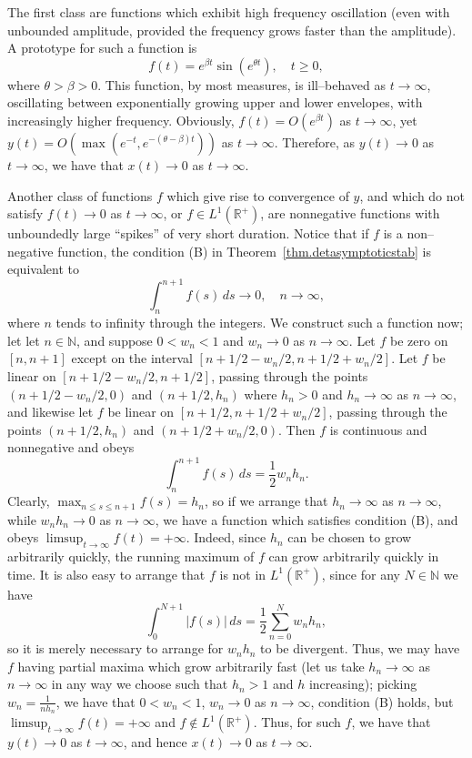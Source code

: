 \documentclass[a4paper,10pt,reqno]{amsart}
\numberwithin{equation}{section}
\theoremstyle{definition}
\theoremstyle{remark}
\DeclareMathOperator{\1}{\mathbbm 1}
\begin{document}
	The first class are functions which exhibit high frequency oscillation (even with unbounded amplitude, provided the frequency grows faster than the amplitude). A prototype for such a function is 
	\[
	f(t)= e^{\beta t}\sin(e^{\theta t}), \quad t\geq 0,
	\]  
	where $\theta>\beta>0$. This function, by most measures, is ill--behaved as $t\to\infty$, oscillating between exponentially growing upper and lower envelopes, with increasingly higher frequency. Obviously, $f(t)=O(e^{\beta t})$ as $t\to\infty$, yet $y(t)=O(\max(e^{-t},e^{-(\theta-\beta)t}))$ as $t\to\infty$. Therefore, as $y(t)\to 0$ as $t\to\infty$, we have that $x(t)\to 0$ as $t\to\infty$. 
	
	Another class of functions $f$ which give rise to convergence of $y$, and which do not satisfy $f(t)\to 0$ as $t\to\infty$, or $f\in L^1(\mathbb{R}^+)$, are nonnegative functions with unboundedly large ``spikes'' of very short duration. Notice that if $f$ is a non--negative function, the condition (B) in Theorem~\ref{thm.detasymptoticstab} is equivalent to 
	\[
	\int_n^{n+1} f(s)\,ds \to 0, \quad n\to\infty,
	\]  
	where $n$ tends to infinity through the integers. We construct such a function now; let let $n\in \mathbb{N}$, and suppose $0<w_n<1$ and $w_n\to 0$ as $n\to\infty$. Let $f$ be zero on $[n,n+1]$ except on the interval $[n+1/2-w_n/2,n+1/2+w_n/2]$. Let $f$ be linear on $[n+1/2-w_n/2,n+1/2]$, passing through the points $(n+1/2-w_n/2,0)$ and $(n+1/2,h_n)$ where $h_n>0$ and $h_n\to\infty$ as $n\to\infty$, and likewise let $f$ be linear on  $[n+1/2,n+1/2+w_n/2]$, passing through the points  $(n+1/2,h_n)$ and $(n+1/2+w_n/2,0)$. Then $f$ is continuous and nonnegative and obeys 
	\[
	\int_{n}^{n+1} f(s)\,ds  = \frac{1}{2}w_n h_n.
	\] 
	Clearly, $\max_{n\leq s\leq n+1} f(s) = h_n$, so if we arrange that $h_n\to \infty$ as $n\to\infty$, while $w_n h_n\to 0$ as $n\to\infty$, we have a function which satisfies condition (B), and obeys $\limsup_{t\to\infty} f(t)=+\infty$. Indeed, since $h_n$ can be chosen to grow arbitrarily quickly, the running maximum of $f$ can grow arbitrarily quickly in time. It is also easy to arrange that $f$ is not in $L^1(\mathbb{R}^+)$, since for any
	$N\in \mathbb{N}$ we have 
	\[
	\int_0^{N+1} |f(s)|\,ds = \frac{1}{2} \sum_{n=0}^N w_n h_n,
	\]
	so it is merely necessary to arrange for $w_n h_n$ to be divergent. Thus, we may have $f$ having partial maxima which grow arbitrarily fast (let us take $h_n\to \infty$ as $n\to\infty$ in any way we choose such that  $h_n>1$ and $h$ increasing); picking $w_n=\frac{1}{nh_n}$, we have that  $0<w_n<1$, $w_n\to 0$ as $n\to\infty$, condition (B) holds, but $\limsup_{t\to\infty} f(t)=+\infty$ and $f\not\in L^1(\mathbb{R}^+)$. Thus, for such $f$, we have that $y(t)\to 0$ as $t\to\infty$, and hence $x(t)\to 0$ as $t\to\infty$.   
	
\end{document}
